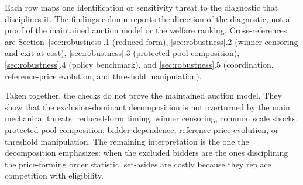 \begin{table}[!htbp]
\begin{threeparttable}
\begin{tabular}{>{\raggedright\arraybackslash}p{}>{\raggedright\arraybackslash}p{}>{\raggedright\arraybackslash}p{}>{\raggedright\arraybackslash}p{}}
\bottomrule
\end{tabular}
\begin{tablenotes}\footnotesize
\item Each row maps one identification or sensitivity threat to the
diagnostic that disciplines it. The findings column reports the
direction of the diagnostic, not a proof of the maintained auction model
or the welfare ranking. Cross-references are
Section~\ref{sec:robustness}.1 (reduced-form), \ref{sec:robustness}.2
(winner censoring and exit-at-cost), \ref{sec:robustness}.3
(protected-pool composition), \ref{sec:robustness}.4 (policy benchmark),
and \ref{sec:robustness}.5 (coordination, reference-price evolution, and
threshold manipulation).
\end{tablenotes}
\end{threeparttable}
\end{table}

Taken together, the checks do not prove the maintained auction model.
They show that the exclusion-dominant decomposition is not overturned by
the main mechanical threats: reduced-form timing, winner censoring,
common scale shocks, protected-pool composition, bidder dependence,
reference-price evolution, or threshold manipulation. The remaining
interpretation is the one the decomposition emphasizes: when the excluded
bidders are the ones disciplining the price-forming order statistic,
set-asides are costly because they replace competition with eligibility.
